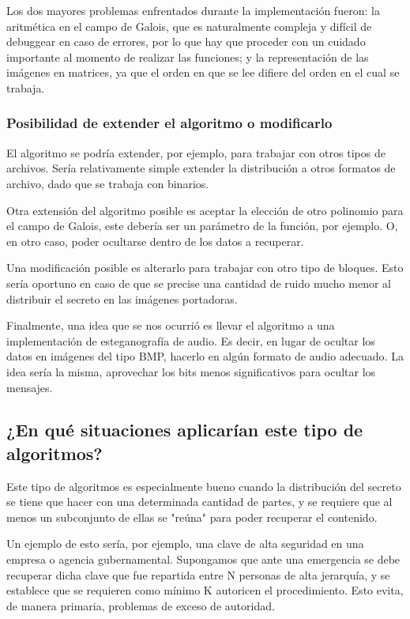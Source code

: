 \documentclass[11pt]{scrartcl} %
\begin{document}
Los dos mayores problemas enfrentados durante la implementación fueron: la aritmética en el campo de Galois, que es naturalmente compleja y difícil de debuggear en caso de errores, por lo que hay que proceder con un cuidado importante al momento de realizar las funciones; y la representación de las imágenes en matrices, ya que el orden en que se lee difiere del orden en el cual se trabaja.

\subsubsection{Posibilidad de extender el algoritmo o modificarlo}

El algoritmo se podría extender, por ejemplo, para trabajar con otros tipos de archivos. Sería relativamente simple extender la distribución a otros formatos de archivo, dado que se trabaja con binarios.

Otra extensión del algoritmo posible es aceptar la elección de otro polinomio para el campo de Galois, este debería ser un parámetro de la función, por ejemplo. O, en otro caso, poder ocultarse dentro de los datos a recuperar.

Una modificación posible es alterarlo para trabajar con otro tipo de bloques. Esto sería oportuno en caso de que se precise una cantidad de ruido mucho menor al distribuir el secreto en las imágenes portadoras.

Finalmente, una idea que se nos ocurrió es llevar el algoritmo a una implementación de esteganografía de audio. Es decir, en lugar de ocultar los datos en imágenes del tipo BMP, hacerlo en algún formato de audio adecuado. La idea sería la misma, aprovechar los bits menos significativos para ocultar los mensajes.

\subsection{¿En qué situaciones aplicarían este tipo de algoritmos?}

Este tipo de algoritmos es especialmente bueno cuando la distribución del secreto se tiene que hacer con una determinada cantidad de partes, y se requiere que al menos un subconjunto de ellas se "reúna" para poder recuperar el contenido.

Un ejemplo de esto sería, por ejemplo, una clave de alta seguridad en una empresa o agencia gubernamental. Supongamos que ante una emergencia se debe recuperar dicha clave que fue repartida entre N personas de alta jerarquía, y se establece que se requieren como mínimo K autoricen el procedimiento. Esto evita, de manera primaria, problemas de exceso de autoridad.
\end{document}
